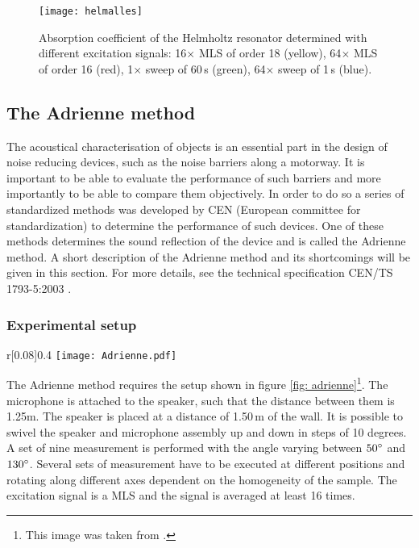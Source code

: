 \begin{figure}[h!]
  \centering
    \texttt{[image: helmalles]}
  \caption{Absorption coefficient of the Helmholtz resonator determined with different excitation signals: 16$\times$ MLS of order 18 (yellow), 64$\times$ MLS of order 16 (red), 1$\times$ sweep of 60\,s (green), 64$\times$ sweep of 1\,s (blue).}
  \label{fig: helmholtzalles}
\end{figure}


\subsection{The Adrienne method}
The acoustical characterisation of objects is an essential part in the design of noise reducing devices, such as the noise barriers along a motorway. It is important to be able to evaluate the performance of such barriers and more importantly to be able to compare them objectively. In order to do so a series of standardized methods was developed by CEN (European committee for standardization) to determine the performance of such devices. One of these methods determines the sound reflection of the device and is called the Adrienne method. A short description of the Adrienne method and its shortcomings will be given in this section. For more details, see the technical specification CEN/TS 1793-5:2003 \cite{Adrienne}.



\subsubsection{Experimental setup}

\begin{wrapfigure}{r}[0.08\textwidth]{0.4\textwidth}
	\vspace{-40pt}
  \centering
    \texttt{[image: Adrienne.pdf]}
  \caption{Setup for the reflection index measurements according to the Adrienne method.}
  \label{fig: adrienne}
  \vspace{-40pt}
\end{wrapfigure}
The Adrienne method requires the setup shown in figure \ref{fig: adrienne}\footnote{This image was taken from \cite[p.45]{Geetere}.}. The microphone is attached to the speaker, such that the distance between them is 1.25m. The speaker is placed at a distance of 1.50\,m of the wall. It is possible to swivel the speaker and microphone assembly up and down in steps of 10 degrees. A set of nine measurement is performed with the angle varying between $50^{\circ}$ and $130^{\circ}$.  Several sets of measurement have to be executed at different positions and rotating along different axes dependent on the homogeneity of the sample.
The excitation signal is a MLS and the signal is averaged at least 16 times.


